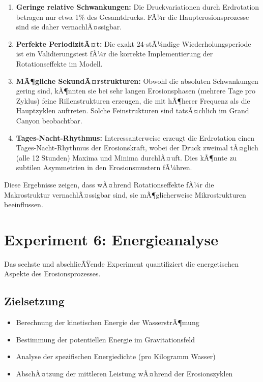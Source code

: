 ﻿\documentclass[12pt,a4paper]{report}
\begin{document}
\begin{enumerate}
	\item \textbf{Geringe relative Schwankungen:} Die Druckvariationen durch Erdrotation betragen nur etwa 1\% des Gesamtdrucks. FÃ¼r die Haupterosionsprozesse sind sie daher vernachlÃ¤ssigbar.
	
	\item \textbf{Perfekte PeriodizitÃ¤t:} Die exakt 24-stÃ¼ndige Wiederholungsperiode ist ein Validierungstest fÃ¼r die korrekte Implementierung der Rotationseffekte im Modell.
	
	\item \textbf{MÃ¶gliche SekundÃ¤rstrukturen:} Obwohl die absoluten Schwankungen gering sind, kÃ¶nnten sie bei sehr langen Erosionsphasen (mehrere Tage pro Zyklus) feine Rillenstrukturen erzeugen, die mit hÃ¶herer Frequenz als die Hauptzyklen auftreten. Solche Feinstrukturen sind tatsÃ¤chlich im Grand Canyon beobachtbar.
	
	\item \textbf{Tages-Nacht-Rhythmus:} Interessanterweise erzeugt die Erdrotation einen \glqq Tages-Nacht-Rhythmus\grqq{} der Erosionskraft, wobei der Druck zweimal tÃ¤glich (alle 12 Stunden) Maxima und Minima durchlÃ¤uft. Dies kÃ¶nnte zu subtilen Asymmetrien in den Erosionsmustern fÃ¼hren.
\end{enumerate}

Diese Ergebnisse zeigen, dass wÃ¤hrend Rotationseffekte fÃ¼r die Makrostruktur vernachlÃ¤ssigbar sind, sie mÃ¶glicherweise Mikrostrukturen beeinflussen.

\section{Experiment 6: Energieanalyse}

Das sechste und abschlieÃŸende Experiment quantifiziert die energetischen Aspekte des Erosionsprozesses.

\subsection{Zielsetzung}

\begin{itemize}
	\item Berechnung der kinetischen Energie der WasserstrÃ¶mung
	\item Bestimmung der potentiellen Energie im Gravitationsfeld
	\item Analyse der spezifischen Energiedichte (pro Kilogramm Wasser)
	\item AbschÃ¤tzung der mittleren Leistung wÃ¤hrend der Erosionszyklen
\end{itemize}
\end{document}
